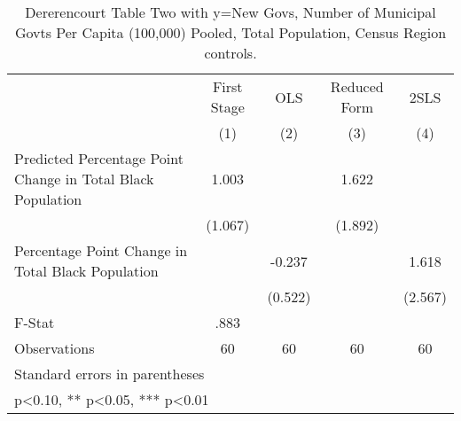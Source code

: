 \begin{table}[htbp]\centering
\def\sym#1{\ifmmode^{#1}\else\(^{#1}\)\fi}
\caption{Dererencourt Table Two with y=New Govs, Number of Municipal Govts Per Capita (100,000) Pooled, Total Population, Census Region controls.}
\begin{tabular}{l*{4}{c}}
\toprule
                    & First Stage   &         OLS   &Reduced Form   &        2SLS   \\
                    &\multicolumn{1}{c}{(1)}   &\multicolumn{1}{c}{(2)}   &\multicolumn{1}{c}{(3)}   &\multicolumn{1}{c}{(4)}   \\
\midrule
Predicted Percentage Point Change in Total Black Population&       1.003   &               &       1.622   &               \\
                    &     (1.067)   &               &     (1.892)   &               \\
\addlinespace
Percentage Point Change in Total Black Population&               &      -0.237   &               &       1.618   \\
                    &               &     (0.522)   &               &     (2.567)   \\
\midrule
F-Stat              &        .883   &               &               &               \\
Observations        &          60   &          60   &          60   &          60   \\
\bottomrule
\multicolumn{5}{l}{\footnotesize Standard errors in parentheses}\\
\multicolumn{5}{l}{\footnotesize * p<0.10, ** p<0.05, *** p<0.01}\\
\end{tabular}
\end{table}
